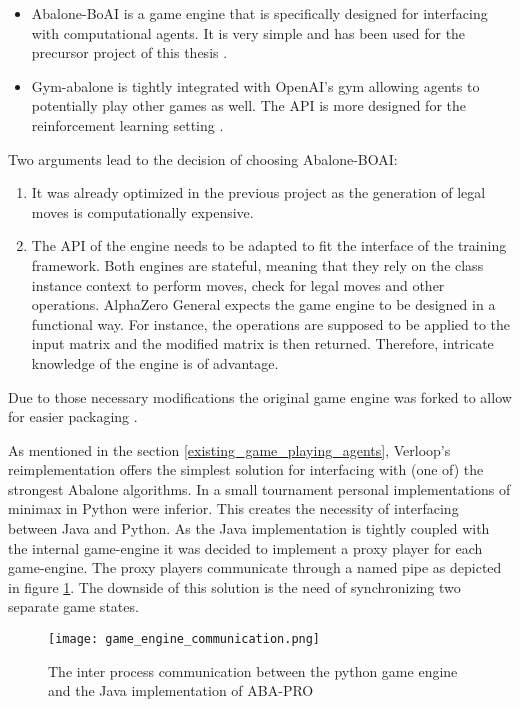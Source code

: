 \begin{itemize}
    \item Abalone-BoAI is a game engine that is specifically designed for interfacing with computational agents. It is very simple and has been used for the precursor project of this thesis \cite{scriptim_scriptimabalone-boai_2021}.
    \item Gym-abalone is tightly integrated with OpenAI's gym allowing agents to potentially play other games as well. The API is more designed for the reinforcement learning setting \cite{towzeur_towzeurgym-abalone_2021}.
\end{itemize}

Two arguments lead to the decision of choosing Abalone-BOAI:
\begin{enumerate}
    \item It was already optimized in the previous project as the generation of legal moves is computationally expensive.
    \item The API of the engine needs to be adapted to fit the interface of the training framework. Both engines are stateful, meaning that they rely on the class instance context to perform moves, check for legal moves and other operations. AlphaZero General expects the game engine to be designed in a functional way. For instance, the operations are supposed to be applied to the input matrix and the modified matrix is then returned. Therefore, intricate knowledge of the engine is of advantage.
\end{enumerate}

Due to those necessary modifications the original game engine was forked to allow for easier packaging \cite{campfireman_campfiremanabalone-boai_2021}.

As mentioned in the section \ref{existing_game_playing_agents}, Verloop's reimplementation \cite{verloop_abaloneai_nodate} offers the simplest solution for interfacing with (one of) the strongest Abalone algorithms. In a small tournament personal implementations of minimax in Python \cite{claussen_abalone_2021} were inferior. This creates the necessity of interfacing between Java and Python. As the Java implementation is tightly coupled with the internal game-engine it was decided to implement a proxy player for each game-engine. The proxy players communicate through a named pipe as depicted in figure \ref{python_java_ipc}. The downside of this solution is the need of synchronizing two separate game states.

\begin{figure}
    \centering
    \texttt{[image: game\_engine\_communication.png]}
    \caption{The inter process communication between the python game engine and the Java implementation of ABA-PRO}
    \label{python_java_ipc}
\end{figure}

